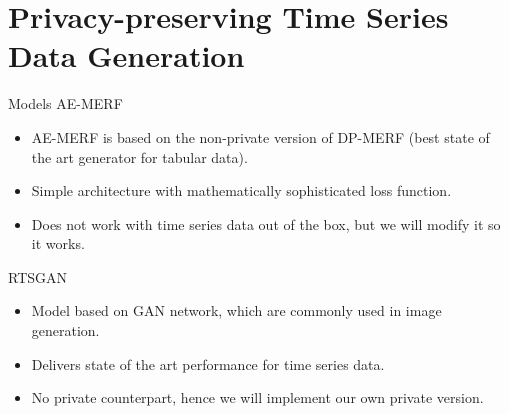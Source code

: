\section{Privacy-preserving Time Series Data Generation}
\begin{frame}{Models}
    AE-MERF
    \begin{itemize}
        \item AE-MERF is based on the non-private version of DP-MERF (best state of the art generator for tabular data).
        \item Simple architecture with mathematically sophisticated loss function.
        \item Does not work with time series data out of the box, but we will modify it so it works.
    \end{itemize}
    RTSGAN
    \begin{itemize}
        \item Model based on GAN network, which are commonly used in image generation.
        \item Delivers state of the art performance for time series data.
        \item No private counterpart, hence we will implement our own private version.
    \end{itemize}
    
\end{frame}

